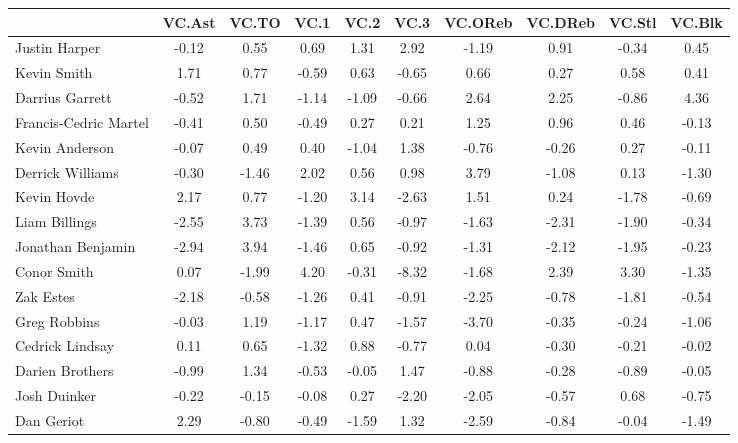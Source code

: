 \documentclass[10pt,letterpaper]{article}
\begin{document}
\begin{table}[ht]
\begin{center}
\begin{tabular}{lccccccccc}
  \hline
 & VC.Ast & VC.TO & VC.1 & VC.2 & VC.3 & VC.OReb & VC.DReb & VC.Stl & VC.Blk \\ 
  \hline
Justin Harper & -0.12 & 0.55 & 0.69 & 1.31 & 2.92 & -1.19 & 0.91 & -0.34 & 0.45 \\ 
  Kevin Smith & 1.71 & 0.77 & -0.59 & 0.63 & -0.65 & 0.66 & 0.27 & 0.58 & 0.41 \\ 
  Darrius Garrett & -0.52 & 1.71 & -1.14 & -1.09 & -0.66 & 2.64 & 2.25 & -0.86 & 4.36 \\ 
  Francis-Cedric Martel & -0.41 & 0.50 & -0.49 & 0.27 & 0.21 & 1.25 & 0.96 & 0.46 & -0.13 \\ 
  Kevin Anderson & -0.07 & 0.49 & 0.40 & -1.04 & 1.38 & -0.76 & -0.26 & 0.27 & -0.11 \\ 
  Derrick Williams & -0.30 & -1.46 & 2.02 & 0.56 & 0.98 & 3.79 & -1.08 & 0.13 & -1.30 \\ 
  Kevin Hovde & 2.17 & 0.77 & -1.20 & 3.14 & -2.63 & 1.51 & 0.24 & -1.78 & -0.69 \\ 
  Liam Billings & -2.55 & 3.73 & -1.39 & 0.56 & -0.97 & -1.63 & -2.31 & -1.90 & -0.34 \\ 
  Jonathan Benjamin & -2.94 & 3.94 & -1.46 & 0.65 & -0.92 & -1.31 & -2.12 & -1.95 & -0.23 \\ 
  Conor Smith & 0.07 & -1.99 & 4.20 & -0.31 & -8.32 & -1.68 & 2.39 & 3.30 & -1.35 \\ 
  Zak Estes & -2.18 & -0.58 & -1.26 & 0.41 & -0.91 & -2.25 & -0.78 & -1.81 & -0.54 \\ 
  Greg Robbins & -0.03 & 1.19 & -1.17 & 0.47 & -1.57 & -3.70 & -0.35 & -0.24 & -1.06 \\ 
  Cedrick Lindsay & 0.11 & 0.65 & -1.32 & 0.88 & -0.77 & 0.04 & -0.30 & -0.21 & -0.02 \\ 
  Darien Brothers & -0.99 & 1.34 & -0.53 & -0.05 & 1.47 & -0.88 & -0.28 & -0.89 & -0.05 \\ 
  Josh Duinker & -0.22 & -0.15 & -0.08 & 0.27 & -2.20 & -2.05 & -0.57 & 0.68 & -0.75 \\ 
  Dan Geriot & 2.29 & -0.80 & -0.49 & -1.59 & 1.32 & -2.59 & -0.84 & -0.04 & -1.49 \\ 
   \hline
\end{tabular}
\end{center}
\end{table}
\end{document}
